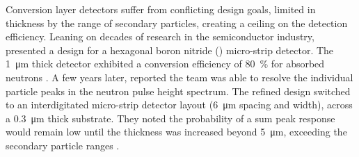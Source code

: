 \documentclass[../../../main.tex]{subfiles}
\begin{document}
    \par%
    Conversion layer detectors suffer from conflicting design goals, limited in thickness by the range of secondary particles, creating a ceiling on the detection efficiency.  
    Leaning on decades of research in the semiconductor industry, \citeauthor*{Li_2011} presented a design for a hexagonal boron nitride () micro-strip detector.
    The \SI{1}{\micro\meter} thick  detector exhibited a conversion efficiency of \SI{80}{\percent} for absorbed neutrons \cite{Li_2011}.
    A few years later, \citeauthor*{Doan_2015} reported the team was able to resolve the individual particle peaks in the neutron pulse height spectrum.
    The refined design switched to an interdigitated micro-strip detector layout (\SI{6}{\micro\meter} spacing and width), across a \SI{0.3}{\micro\meter} thick  substrate.
    They noted the probability of a sum peak response would remain low until the thickness was increased beyond \SI{5}{\micro\meter}, exceeding the secondary particle ranges \cite{Doan_2015}.
\end{document}
